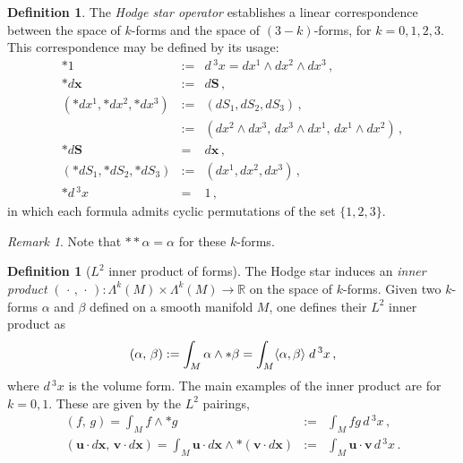 \documentclass[11pt, oneside]{article}   	%
\numberwithin{equation}{section}
\theoremstyle{plain}
\theoremstyle{definition}
\newtheorem{definition}[theorem]{Definition}
\theoremstyle{remark}
\newtheorem{remark}[theorem]{Remark}
\newcommand{\<}{\langle}
\renewcommand{\>}{\rangle}
\begin{document}
\begin{definition}
The \emph{Hodge star operator} establishes a linear correspondence between the space of $k$-forms and the space of $(3-k)$-forms, for $k=0,1,2,3$. This correspondence may be defined by its usage: 
\begin{eqnarray*}
*1&:=& d\,^3x = dx^1\wedge dx^2\wedge dx^3\,,\\
*d\mathbf{x} &:=& d\mathbf{S}\,,\\
(*dx^1,*dx^2,*dx^3) &:=& (dS_1,dS_2,dS_3)\,,\\
&:=&(dx^2\wedge dx^3,\,dx^3\wedge dx^1,\,dx^1\wedge dx^2)\,,\\
*d\mathbf{S} &=&d\mathbf{x} \,,\\
(*dS_1,*dS_2,*dS_3)&:=&(dx^1,dx^2,dx^3)  \,,\\
*d\,^3x &=& 1
\,,
\end{eqnarray*}
in which each formula admits cyclic permutations of the set $\{1,2,3\}$. 
\end{definition}

\begin{remark}
Note that $*\!*\alpha=\alpha$ for these $k$-forms.
\end{remark}

\begin{definition}[$L^2$ inner product of forms]\label{innerproductforms-def}
The Hodge star induces an \emph{inner product} $(\,\cdot\,,\,\cdot\,):\Lambda^k(M)\times\Lambda^k(M)\to\mathbb{R}$ on the space of $k$-forms. Given two $k$-forms $\alpha$ and $\beta$ defined on a smooth manifold $M$, one defines their $L^2$ inner product as
\begin{eqnarray} \index{inner product!differential forms}
(\alpha,\,\beta)
: =
\int_M \alpha\wedge *\beta = \int_M \langle \alpha, \beta \rangle\;d\,^3x
\,,\label{innerproductforms-eqn}
\end{eqnarray}
where $d\,^3x$ is the volume form. The main examples of the inner product are for $k=0,1$. These are given by the $L^2$ pairings,
\begin{eqnarray*}
(f,\,g) = \int_M f\wedge *g&:=& \int_M fg\,d\,^3x \,,\\
(\mathbf{u}\cdot d\mathbf{x},\,\mathbf{v}\cdot d\mathbf{x})
=
\int_M \mathbf{u}\cdot d\mathbf{x}
\wedge *(\mathbf{v}\cdot d\mathbf{x})
&:=& \int_M \mathbf{u}\cdot \mathbf{v}\,d\,^3x\,.
\end{eqnarray*}
\end{definition}
\end{document}
